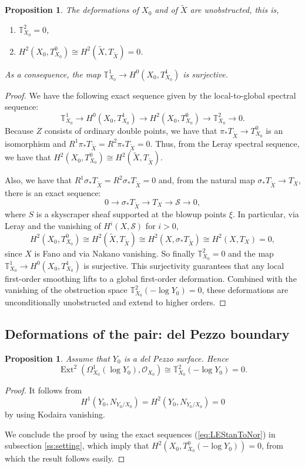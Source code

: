 \documentclass[11pt]{article}
\newtheorem{prop}[thm]{Proposition}
\theoremstyle{definition}
\newcommand{\OO}{\mathcal{O}}
\DeclareMathOperator{\Ext}{Ext}
\newcommand{\push}{\pi_*}             %
\begin{document}
\begin{prop}\label{prop:defAbs} The deformations of $X_0$ and of $\tilde X$ are unobstructed, this is, 
  \begin{enumerate}
  \item $\mathbb{T}_{X_0}^2=0$,
  \item $H^2(X_0,T_{X_0}^0)\cong H^2(\tilde X, T_{\tilde X})=0$.
  \end{enumerate} 
  As a consequence, the map $\mathbb{T}_{X_0}^1\to H^0(X_0, T_{X_0}^1)$ is surjective.
\end{prop}
\begin{proof}
  We have the following exact sequence given by the local-to-global spectral sequence:
  $$\mathbb{T}_{X_0}^1\to H^0(X_0,T_{X_0}^1)\to H^2(X_0, T_{X_0}^0)\to \mathbb{T}_{X_0}^2\to 0. $$
  Because $Z$ consists of ordinary double points, we have that $\push T_{\tilde X}\to T_{X_0}^0$ is an isomorphism and $R^1\push T_{\tilde X}=R^2\push T_{\tilde X}=0.$
  Thus, from the Leray spectral sequence, we have that $H^2(X_0,T_{X_0}^0)\cong H^2(\tilde X, T_{\tilde X})$. 

  Also, we have that $R^1\sigma_* T_{\tilde X}=R^2\sigma_* T_{\tilde X}=0$ and, from the natural map $\sigma_* T_{\tilde X}\to T_X$, there is an exact sequence:
  $$0\to \sigma_* T_{\tilde X}\to T_X\to \mathcal{S}\to 0, $$
  where $S$ is a skyscraper sheaf supported at the blowup points $\xi$. In particular, via Leray and the vanishing of $H^i(X,\mathcal{S})$ for $i>0$, 
  $$H^2(X_0, T_{X_0}^0)\cong H^2(\tilde X, T_{\tilde X})\cong H^2(X, \sigma_* T_{\tilde X})\cong H^2(X, T_X)=0, $$
  since $X$ is Fano and via Nakano vanishing. So finally $\mathbb{T}_{X_0}^2=0$ and the map $\mathbb{T}_{X_0}^1\to H^0(X_0, T_{X_0}^1)$ is surjective. This surjectivity guarantees that any local first-order smoothing lifts to a global first-order deformation. Combined with the vanishing of the obstruction space $\mathbb{T}_{X_0}^2(-\log Y_0) = 0$, these deformations are unconditionally unobstructed and extend to higher orders.
\end{proof}

\subsection{Deformations of the pair: del Pezzo boundary}
\begin{prop}
  Assume that $Y_0$ is a del Pezzo surface. Hence
  $$\Ext^2(\Omega_{X_0}^1(\log Y_0),\OO_{X_0})\cong \mathbb{T}_{X_0}^2(-\log Y_0)=0. $$
\end{prop}
\begin{proof}
  It follows from 
  $$H^1(Y_0, N_{Y_0/X_0})=H^2(Y_0, N_{Y_0/X_0})=0 $$
  by using Kodaira vanishing.

  We conclude the proof by using the exact sequences (\ref{eq:LEStanToNor}) in subsection \ref{ss:setting}, which imply that $H^2(X_0, T_{X_0}^0(-\log Y_0))=0$, from which the result follows easily.
\end{proof}
\end{document}
